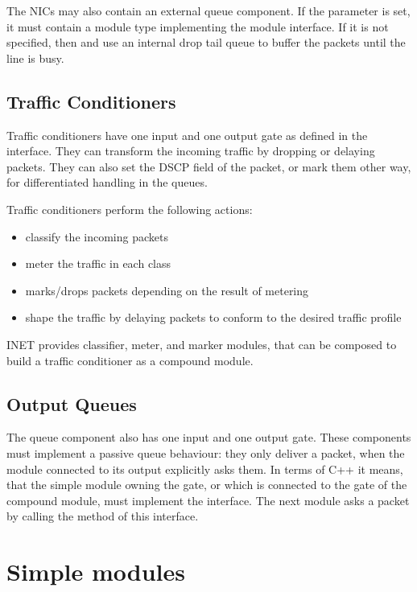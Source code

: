 The NICs may also contain an external queue component. If the 
parameter is set, it must contain a module type implementing the 
module interface. If it is not specified, then  and 
use an internal drop tail queue to buffer the packets until the line is busy.

\subsection{Traffic Conditioners}

Traffic conditioners have one input
and one output gate as defined in the 
interface. They can transform the incoming traffic by dropping or
delaying packets. They can also set the DSCP field of the packet,
or mark them other way, for differentiated handling in the queues.

Traffic conditioners perform the following actions:
\begin{itemize}
 \item classify the incoming packets
 \item meter the traffic in each class
 \item marks/drops packets depending on the result of metering
 \item shape the traffic by delaying packets to conform to the
       desired traffic profile
\end{itemize}

INET provides classifier, meter, and marker modules, that can be
composed to build a traffic conditioner as a compound module.

\subsection{Output Queues}

The queue component also has one input and one output gate. These components
must implement a passive queue behaviour: they only deliver a packet,
when the module connected to its output explicitly asks them.
In terms of C++ it means, that the simple module owning the  gate,
or which is connected to the  gate of the compound module,
must implement the  interface. The next module
asks a packet by calling the  method of this interface.


\section{Simple modules}

